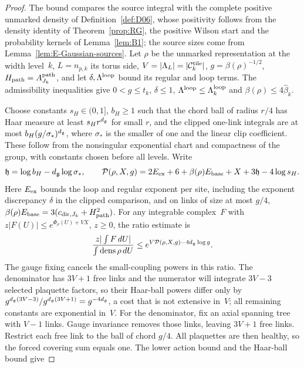 \begin{proof}
The bound compares the source integral with the complete positive unmarked density of Definition~\ref{def:D06}, whose positivity follows from the density identity of Theorem~\ref{prop:RG}, the positive Wilson start and the probability kernels of Lemma~\ref{lem:B1}; the source sizes come from Lemma~\ref{lem:E-Gaussian-sources}. Let $\rho$ be the unmarked representation at the width level~$k$, $L=n_{p,k}$ its torus side, $V=|\Lambda_L|=|\mathcal C^{\rm tile}_k|$, $g=\beta(\rho)^{-1/2}$, $H_{\rm path}=A_{J_k}^{\rm path}$, and let $\delta,\Lambda^{\rm loop}$ bound its regular and loop terms. The admissibility inequalities give $0<g\le t_k$, $\delta\le1$, $\Lambda^{\rm loop}\le\Lambda_k^{\rm loop}$ and $\beta(\rho)\le4\widehat\beta_k$.

Choose constants $s_H\in(0,1]$, $b_H\ge1$ such that the chord ball of radius $r/4$ has Haar measure at least $s_Hr^{d_{\mathfrak{g}}}$ for small $r$, and the clipped one-link integrals are at most $b_H(g/\sigma_*)^{d_{\mathfrak{g}}}$, where $\sigma_*$ is the smaller of one and the linear clip coefficient. These follow from the nonsingular exponential chart and compactness of the group, with constants chosen before all levels. Write
\begin{equation*}
 \mathfrak h=\log b_H-d_{\mathfrak{g}}\log\sigma_*,\qquad
 \mathcal P(\rho,X,g)=2E_{\rm ex}+6+
 \beta(\rho)E_{\rm base}+X+3\mathfrak h-4\log s_H.
\end{equation*}
Here $E_{\rm ex}$ bounds the loop and regular exponent per site, including the exponent discrepancy $\delta$ in the clipped comparison, and on links of size at most $g/4$,
$\beta(\rho)E_{\rm base}=3(c_{{\rm dir},J_k}+H_{\rm path}^2)$. For any integrable complex~$F$ with
$z|F(U)|\le e^{\Phi_\rho(U)+VX}$, $z\ge0$, the ratio estimate is
\begin{equation}\label{eq:E-positive-ratio}
 \frac{z|\int F\,dU|}{\int\operatorname{dens}\rho\,dU}
 \le e^{V\mathcal P(\rho,X,g)-4d_{\mathfrak{g}}\log g}.
\end{equation}
The gauge fixing cancels the small-coupling powers in this ratio. The denominator has $3V+1$ free links and the numerator will integrate $3V-3$ selected plaquette factors, so their Haar-ball powers differ only by $g^{d_{\mathfrak{g}}(3V-3)}/g^{d_{\mathfrak{g}}(3V+1)}=g^{-4d_{\mathfrak{g}}}$, a cost that is not extensive in~$V$; all remaining constants are exponential in~$V$. For the denominator, fix an axial spanning tree with $V-1$ links. Gauge invariance removes those links, leaving $3V+1$ free links. Restrict each free link to the ball of chord $g/4$. All plaquettes are then healthy, so the forced covering sum equals one. The lower action bound and the Haar-ball bound give

\end{proof}
